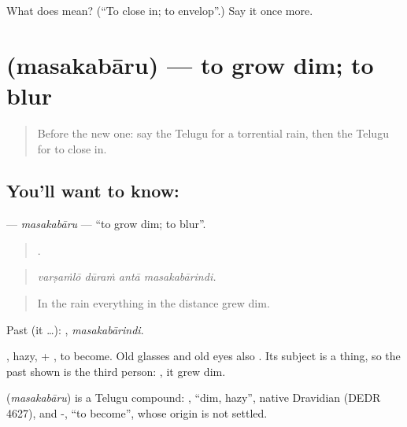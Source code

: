 \begin{tcolorbox}[breakable,colback=teal!4,colframe=teal!35!black,title={Before you move on}]
What does  mean? (\textquotedblleft{}To close in; to envelop\textquotedblright{}.) Say it once more.
\end{tcolorbox}
\section[\texorpdfstring{\te{మసకబారు} (masakabāru)}{మసకబారు (masakabāru)}]{ (masakabāru) — to grow dim; to blur}

\label{lesson:TE-C479-masakabaru}



\begin{quote}
Before the new one: say the Telugu for a torrential rain, then the Telugu for to close in.
\end{quote}

\subsection*{You'll want to know: }
\textbf{} — \emph{masakabāru} — \textquotedblleft{}to grow dim; to blur\textquotedblright{}.

\begin{quote}
   .
\end{quote}

\begin{quote}
\emph{varṣaṁlō dūraṁ antā masakabārindi.}
\end{quote}

\begin{quote}
In the rain everything in the distance grew dim.
\end{quote}

Past (it …): , \emph{masakabārindi}.

, hazy, + , to become. Old glasses and old eyes also . Its subject is a thing, so the past shown is the third person: , it grew dim.

\begin{cousinweb}
\textbf{} (\emph{masakabāru}) is a Telugu compound: , \textquotedblleft{}dim, hazy\textquotedblright{}, native Dravidian (DEDR 4627), and -, \textquotedblleft{}to become\textquotedblright{}, whose origin is not settled.
\end{cousinweb}

